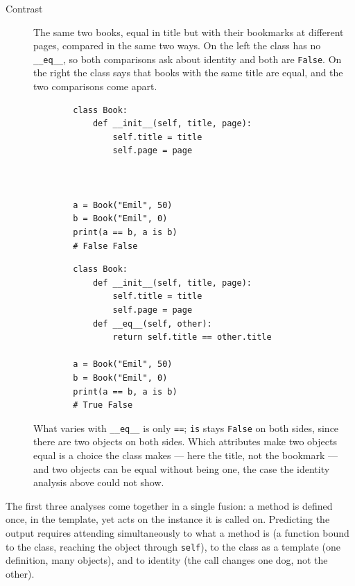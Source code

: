 \begin{description}
  \item[Contrast] The same two books, equal in title but with their bookmarks
    at different pages, compared in the same two ways. On the left the class
    has no \texttt{__eq__}, so both comparisons ask about identity
    and both are \texttt{False}. On the right the class says that
    books with the same title are equal, and the two comparisons come apart.

    \hfill
    \begin{minipage}[t]{0.45\columnwidth}
      \begin{verbatim}
        class Book:
            def __init__(self, title, page):
                self.title = title
                self.page = page



        a = Book("Emil", 50)
        b = Book("Emil", 0)
        print(a == b, a is b)
        # False False
      \end{verbatim}
    \end{minipage}
    \hfill
    \begin{minipage}[t]{0.45\columnwidth}
      \begin{verbatim}
        class Book:
            def __init__(self, title, page):
                self.title = title
                self.page = page
            def __eq__(self, other):
                return self.title == other.title

        a = Book("Emil", 50)
        b = Book("Emil", 0)
        print(a == b, a is b)
        # True False
      \end{verbatim}
    \end{minipage}
    \newline
    What varies with \texttt{__eq__} is only
    \texttt{==}; \texttt{is} stays
    \texttt{False} on both sides, since there are two objects on
    both sides. Which attributes make two objects equal is a choice the class
    makes --- here the title, not the bookmark --- and two objects can be
    equal without being one, the case the identity analysis above could not
    show.
\end{description}

The first three analyses come together in a single fusion: a method is defined once,
in the template, yet acts on the instance it is called on. Predicting the output
requires attending simultaneously to what a method is (a function bound to the
class, reaching the object through \texttt{self}), to the class as a
template (one definition, many objects), and to identity (the call changes one
dog, not the other).

